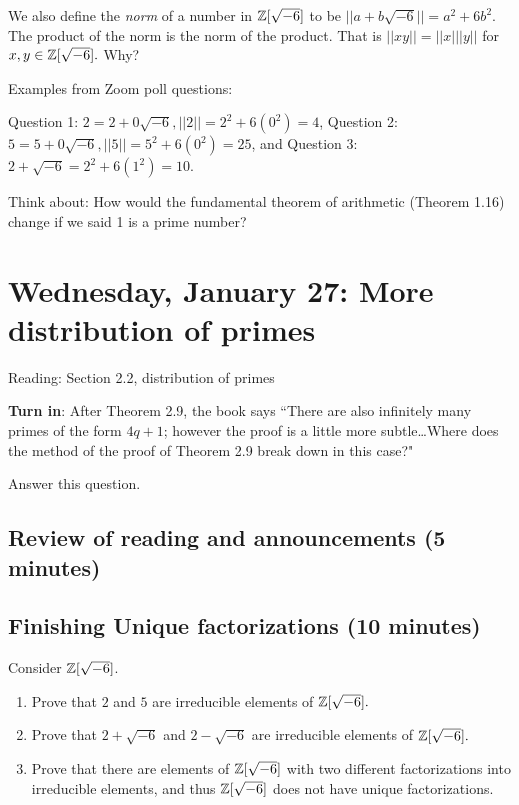 \documentclass[letterpaper, 11 pt]{article}
\begin{document}
We also define the \emph{norm} of a number in $\mathbb Z[\sqrt{-6}]$ to be $||a+b\sqrt{-6}||=a^2+6b^2$. The product of the norm is the norm of the product. That is $||xy||=||x|||y||$ for $x,y\in\mathbb Z[\sqrt{-6}].$ Why?

\begin{example} Examples from Zoom poll questions: 

Question 1: $2=2+0\sqrt{-6}, ||2||=2^2+6(0^2)=4$, Question 2: $5=5+0\sqrt{-6}, ||5||=5^2+6(0^2)=25$, and Question 3: $2+\sqrt{-6}=2^2+6(1^2)=10$.
\end{example}

Think about: How would the fundamental theorem of arithmetic (Theorem 1.16) change if we said 1 is a prime number?

\section{Wednesday, January 27: More distribution of primes}
Reading: Section 2.2, distribution of primes

{\bf Turn in}: After Theorem 2.9, the book says ``There are also infinitely many primes of the form $4q+1$; however the proof is a little more subtle\dots Where does the method of the proof of Theorem 2.9 break down in this case?"

Answer this question.

\subsection{Review of reading and announcements (5 minutes)}
\subsection{Finishing Unique factorizations (10 minutes)}

\begin{br}[10 minutes]
Consider $\mathbb Z[\sqrt{-6}]$. 
\begin{enumerate}
 	\item Prove that $2$ and $5$ are irreducible elements of $\mathbb Z[\sqrt{-6}].$
	\item Prove that $2+\sqrt{-6}$ and $2-\sqrt{-6}$ are irreducible elements of $\mathbb Z[\sqrt{-6}].$
	\item Prove that there are elements of $\mathbb Z[\sqrt{-6}]$ with two different factorizations into irreducible elements, and thus $\mathbb Z[\sqrt{-6}]$ does not have unique factorizations.
\end{enumerate}
\end{br}
\end{document}
